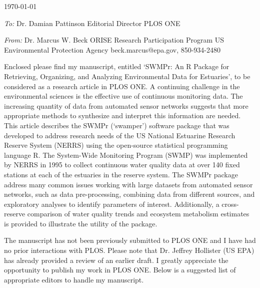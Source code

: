 \documentclass[a4paper,12pt]{article}
\begin{document}
\renewcommand{\rmdefault}{ptm}
\pagestyle{empty} 

\setlength{\parindent}{0mm} 
\setlength{\parskip}{5mm}

\begin{flushright}
\today
\end{flushright}

\emph{To:}\newline
Dr. Damian Pattinson\newline
Editorial Director\newline
PLOS ONE

\emph{From:}\newline
Dr. Marcus W. Beck\newline
ORISE Research Participation Program\newline
US Environmental Protection Agency\newline
beck.marcus@epa.gov, 850-934-2480\vspace{0.1in}

Enclosed please find my manuscript, entitled `SWMPr: An R Package for Retrieving, Organizing, and Analyzing Environmental Data for Estuaries', to be considered as a research article in PLOS ONE. A continuing challenge in the environmental sciences is the effective use of continuous monitoring data.  The increasing quantity of data from automated sensor networks suggests that more appropriate methods to synthesize and interpret this information are needed. This article describes the SWMPr (`swamper') software package that was developed to address research needs of the US National Estuarine Research Reserve System (NERRS) using the open-source statistical programming language R.  The System-Wide Monitoring Program (SWMP) was implemented by NERRS in 1995 to collect continuous water quality data at over 140 fixed stations at each of the estuaries in the reserve system.  The SWMPr package address many common issues working with large datasets from automated sensor networks, such as data pre-processing, combining data from different sources, and exploratory analyses to identify parameters of interest. Additionally, a cross-reserve comparison of water quality trends and ecosystem metabolism estimates is provided to illustrate the utility of the package. 

The manuscript has not been previously submitted to PLOS ONE and I have had no prior interactions with PLOS. Please note that Dr. Jeffrey Hollister (US EPA) has already provided a review of an earlier draft. I greatly appreciate the opportunity to publish my work in PLOS ONE.  Below is a suggested list of appropriate editors to handle my manuscript.
\end{document}
